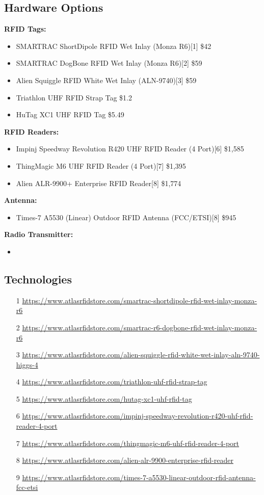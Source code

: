 \documentclass{article}
\begin{document}
\subsection{Hardware Options}
 \textbf{RFID Tags:} 
 \begin{itemize}
	\item SMARTRAC ShortDipole RFID Wet Inlay (Monza R6)[1] \quad \$42
	\item SMARTRAC DogBone RFID Wet Inlay (Monza R6)[2] \quad	\$59
	\item Alien Squiggle RFID White Wet Inlay (ALN-9740)[3] \quad	\$59
	\item Triathlon UHF RFID Strap Tag \quad[4]	\$1.2
	\item HuTag XC1 UHF RFID Tag \quad[5] \$5.49

\end{itemize} 
 \textbf{RFID Readers:} 
  \begin{itemize}
	\item Impinj Speedway Revolution R420 UHF RFID Reader (4 Port)[6] \quad \$1,585
	\item ThingMagic M6 UHF RFID Reader (4 Port)[7] \quad \$1,395
	\item Alien ALR-9900+ Enterprise RFID Reader[8] \quad \$1,774
\end{itemize} 
 \textbf{Antenna:} 
 \begin{itemize}
	\item Times-7 A5530 (Linear) Outdoor RFID Antenna (FCC/ETSI)[8] \quad \$945
\end{itemize} 
\textbf{Radio Transmitter:} 
 \begin{itemize}
	\item
\end{itemize} 

\newpage
\subsection{Technologies}
 \begin{itemize}
	\item [1] \url{https://www.atlasrfidstore.com/smartrac-shortdipole-rfid-wet-inlay-monza-r6 } 
	\item [2] \url{https://www.atlasrfidstore.com/smartrac-r6-dogbone-rfid-wet-inlay-monza-r6 }
	\item [3] \url{https://www.atlasrfidstore.com/alien-squiggle-rfid-white-wet-inlay-aln-9740-higgs-4}  
	\item [4] \url{https://www.atlasrfidstore.com/triathlon-uhf-rfid-strap-tag}
	\item [5] \url{https://www.atlasrfidstore.com/hutag-xc1-uhf-rfid-tag}
	\item [6] \url{https://www.atlasrfidstore.com/impinj-speedway-revolution-r420-uhf-rfid-reader-4-port} 
	\item [7] \url{https://www.atlasrfidstore.com/thingmagic-m6-uhf-rfid-reader-4-port} 
	\item [8] \url{https://www.atlasrfidstore.com/alien-alr-9900-enterprise-rfid-reader} 
	\item [9] \url{https://www.atlasrfidstore.com/times-7-a5530-linear-outdoor-rfid-antenna-fcc-etsi} 
\end{itemize}
\end{document}

